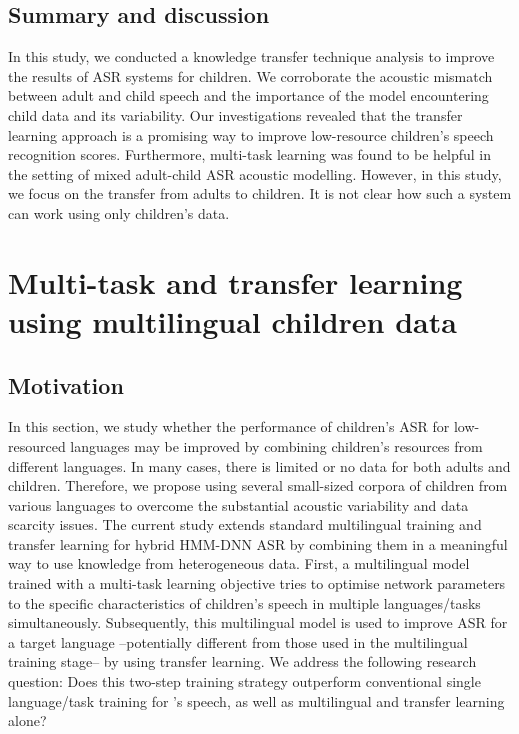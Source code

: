 
\subsection{Summary and discussion}
In this study, we conducted a knowledge transfer technique analysis to improve the results of ASR systems for children. We corroborate the acoustic mismatch between adult and child speech and the importance of the model encountering child data and its variability. Our investigations revealed that the transfer learning approach is a promising way to improve low-resource children's speech recognition scores. Furthermore, multi-task learning was found to be helpful in the setting of mixed adult-child ASR acoustic modelling.
However, in this study, we focus on the transfer from adults to children. It is not clear how such a system can work using only children's data.



\section{Multi-task and transfer learning using multilingual children data}
\subsection{Motivation}
In this section, we study whether the performance of children's ASR for low-resourced languages may be improved by combining children's resources from different languages. In many cases, there is limited or no data for both adults and children. Therefore, we propose using several small-sized corpora of children from various languages to overcome the substantial acoustic variability and data scarcity issues. The current study extends standard multilingual training and transfer learning for hybrid HMM-DNN ASR by combining them in a meaningful way to use knowledge from heterogeneous data. First, a multilingual model trained with a multi-task learning objective tries to optimise network parameters to the specific characteristics of children's speech in multiple languages/tasks simultaneously. Subsequently, this multilingual model is used to improve ASR for a target language --potentially different from those used in the multilingual training stage-- by using transfer learning. We address the following research question: Does this two-step training strategy outperform conventional single language/task training for 's speech, as well as multilingual and transfer learning alone?

